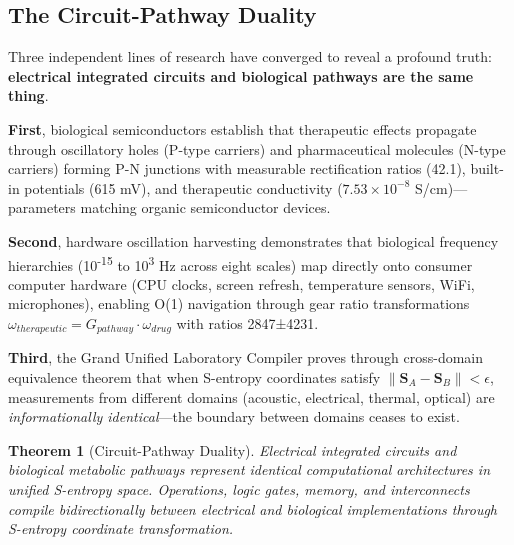 \documentclass[11pt,a4paper]{article}
\newtheorem{theorem}{Theorem}[section]
\begin{document}
\subsection{The Circuit-Pathway Duality}

Three independent lines of research have converged to reveal a profound truth: \textbf{electrical integrated circuits and biological pathways are the same thing}.

\textbf{First}, biological semiconductors establish that therapeutic effects propagate through oscillatory holes (P-type carriers) and pharmaceutical molecules (N-type carriers) forming P-N junctions with measurable rectification ratios (42.1), built-in potentials (615 mV), and therapeutic conductivity ($7.53\times10^{-8}$ S/cm)—parameters matching organic semiconductor devices\cite{biological_semiconductors}.

\textbf{Second}, hardware oscillation harvesting demonstrates that biological frequency hierarchies (10\textsuperscript{-15} to 10\textsuperscript{3} Hz across eight scales) map directly onto consumer computer hardware (CPU clocks, screen refresh, temperature sensors, WiFi, microphones), enabling O(1) navigation through gear ratio transformations $\omega_{therapeutic} = G_{pathway} \cdot \omega_{drug}$ with ratios 2847±4231\cite{hardware_lipid_llm}.

\textbf{Third}, the Grand Unified Laboratory Compiler proves through cross-domain equivalence theorem that when S-entropy coordinates satisfy $\|\mathbf{S}_A - \mathbf{S}_B\| < \epsilon$, measurements from different domains (acoustic, electrical, thermal, optical) are \textit{informationally identical}—the boundary between domains ceases to exist\cite{grand_unification_lab}.

\begin{theorem}[Circuit-Pathway Duality]
Electrical integrated circuits and biological metabolic pathways represent identical computational architectures in unified S-entropy space. Operations, logic gates, memory, and interconnects compile bidirectionally between electrical and biological implementations through S-entropy coordinate transformation.
\end{theorem}
\end{document}

